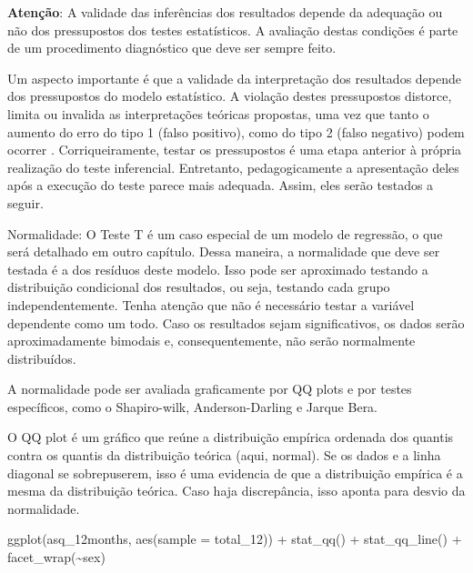 \documentclass[
]{book}
\newenvironment{Shaded}{\begin{snugshade}}{\end{snugshade}}
\newcommand{\AttributeTok}[1]{\textcolor[rgb]{0.77,0.63,0.00}{#1}}
\newcommand{\FunctionTok}[1]{\textcolor[rgb]{0.00,0.00,0.00}{#1}}
\newcommand{\NormalTok}[1]{#1}
\newcommand{\SpecialCharTok}[1]{\textcolor[rgb]{0.00,0.00,0.00}{#1}}
\begin{document}
\textbf{Atenção}: A validade das inferências dos resultados depende da adequação ou não dos pressupostos dos testes estatísticos. A avaliação destas condições é parte de um procedimento diagnóstico que deve ser sempre feito.

Um aspecto importante é que a validade da interpretação dos resultados depende dos pressupostos do modelo estatístico. A violação destes pressupostos distorce, limita ou invalida as interpretações teóricas propostas, uma vez que tanto o aumento do erro do tipo 1 (falso positivo), como do tipo 2 (falso negativo) podem ocorrer \citep{Lix1996, Barker2015, Ernst2017}. Corriqueiramente, testar os pressupostos é uma etapa anterior à própria realização do teste inferencial. Entretanto, pedagogicamente a apresentação deles após a execução do teste parece mais adequada. Assim, eles serão testados a seguir.

Normalidade: O Teste T é um caso especial de um modelo de regressão, o que será detalhado em outro capítulo. Dessa maneira, a normalidade que deve ser testada é a dos resíduos deste modelo. Isso pode ser aproximado testando a distribuição condicional dos resultados, ou seja, testando cada grupo independentemente. Tenha atenção que não é necessário testar a variável dependente como um todo. Caso os resultados sejam significativos, os dados serão aproximadamente bimodais e, consequentemente, não serão normalmente distribuídos.

A normalidade pode ser avaliada graficamente por QQ plots e por testes específicos, como o Shapiro-wilk, Anderson-Darling e Jarque Bera.

O QQ plot é um gráfico que reúne a distribuição empírica ordenada dos quantis contra os quantis da distribuição teórica (aqui, normal). Se os dados e a linha diagonal se sobrepuserem, isso é uma evidencia de que a distribuição empírica é a mesma da distribuição teórica. Caso haja discrepância, isso aponta para desvio da normalidade.

\begin{Shaded}
\begin{Highlighting}[]
\FunctionTok{ggplot}\NormalTok{(asq\_12months, }\FunctionTok{aes}\NormalTok{(}\AttributeTok{sample =}\NormalTok{ total\_12)) }\SpecialCharTok{+} 
  \FunctionTok{stat\_qq}\NormalTok{() }\SpecialCharTok{+} 
  \FunctionTok{stat\_qq\_line}\NormalTok{() }\SpecialCharTok{+}
  \FunctionTok{facet\_wrap}\NormalTok{(}\SpecialCharTok{\textasciitilde{}}\NormalTok{sex)}
\end{Highlighting}
\end{Shaded}
\end{document}
